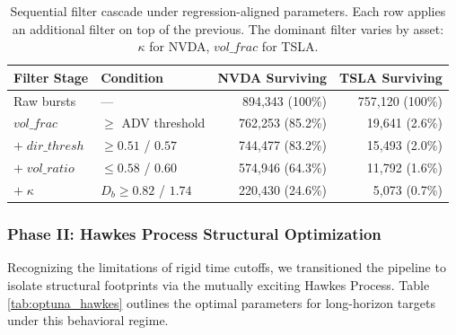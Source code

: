\documentclass[11pt]{article}
\begin{document}
\begin{table}[htbp]
\centering
\begin{tabular}{llrr}
\toprule
\textbf{Filter Stage} & \textbf{Condition} & \textbf{NVDA Surviving} & \textbf{TSLA Surviving} \\
\midrule
Raw bursts & --- & 894,343 (100\%) & 757,120 (100\%) \\
$vol\_frac$ & $\geq$ ADV threshold & 762,253 (85.2\%) & 19,641 (2.6\%) \\
$+ \; dir\_thresh$ & $\geq 0.51$ / $0.57$ & 744,477 (83.2\%) & 15,493 (2.0\%) \\
$+ \; vol\_ratio$ & $\leq 0.58$ / $0.60$ & 574,946 (64.3\%) & 11,792 (1.6\%) \\
$+ \; \kappa$ & $D_b \geq 0.82$ / $1.74$ & 220,430 (24.6\%) & 5,073 (0.7\%) \\
\bottomrule
\end{tabular}
\caption{Sequential filter cascade under regression-aligned parameters. Each row applies an additional filter on top of the previous. The dominant filter varies by asset: $\kappa$ for NVDA, $vol\_frac$ for TSLA.}
\label{tab:filter_cascade}
\end{table}

\subsubsection{Phase II: Hawkes Process Structural Optimization}
Recognizing the limitations of rigid time cutoffs, we transitioned the pipeline to isolate structural footprints via the mutually exciting Hawkes Process. Table \ref{tab:optuna_hawkes} outlines the optimal parameters for long-horizon targets under this behavioral regime.

\begin{table}[htbp]
\centering
{}
\caption{Hawkes-process optimization for the overnight (\texttt{cls\_clop}) target, one row per diagnostic-set name (the \texttt{cls\_clcl}/\texttt{cls\_close} rows are omitted for brevity). Directional-consistency thresholds cluster near 0.5--0.75. The AUCs are in-sample classification maxima and, as Sections~\ref{sec:markout}--\ref{sec:breadth} show, do not translate into deployable out-of-sample edge.}
\label{tab:optuna_hawkes}
\end{table}
\end{document}
